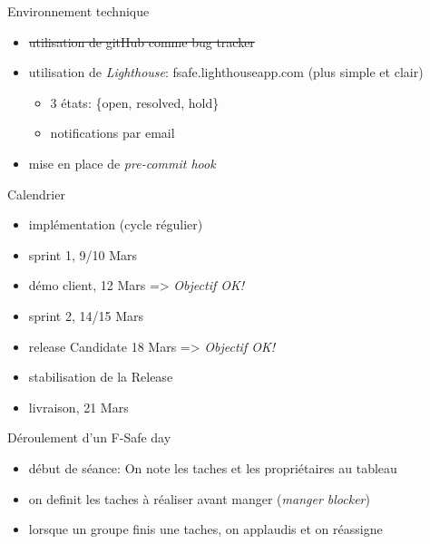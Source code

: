 \begin{frame}{Environnement technique}
  \begin{block}{}
    \begin{itemize}
      \item \sout{utilisation de gitHub comme bug tracker}
      \item utilisation de \emph{Lighthouse}: fsafe.lighthouseapp.com (plus simple et clair)
        \begin{itemize}
          \item 3 états: \{open, resolved, hold\}
          \item notifications par email
        \end{itemize}
      \item mise en place de \emph{pre-commit hook}
    \end{itemize}
  \end{block}
\end{frame}

\begin{frame}{Calendrier}
  \begin{itemize}
    \item implémentation (cycle régulier) 
    \item sprint 1, 9/10 Mars
    \item démo client, 12 Mars => \emph{Objectif OK!}
    \item sprint 2, 14/15 Mars
    \item release Candidate 18 Mars => \emph{Objectif OK!}
    \item stabilisation de la Release
    \item livraison, 21 Mars
  \end{itemize}
\end{frame}

\begin{frame}{Déroulement d'un F-Safe day}
  \begin{itemize}
  \item début de séance: On note les taches et les propriétaires au tableau
  \item on definit les taches à réaliser avant manger (\emph{manger blocker})
  \item lorsque un groupe finis une taches, on applaudis et on réassigne
  \end{itemize}
\end{frame}

